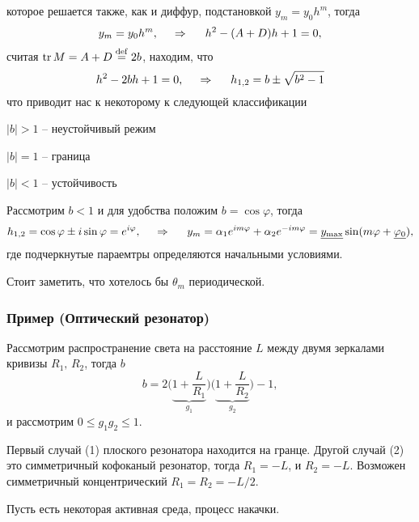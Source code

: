 которое решается также, как и диффур, подстановкой $y_m = y_0 h^m$, тогда
\begin{equation*}
    y_m = y_0 h^m, \hspace{0.5cm} \Rightarrow \hspace{0.5cm}
    h^2 - (A+D) h + 1 = 0,
\end{equation*}
считая $\mathop{\mathrm{tr}}\nolimits M = A+D \overset{\mathrm{def}}{=} 2 b$, находим, что
\begin{equation*}
    h^2 - 2 b h  +1 = 0, 
    \hspace{0.5cm} \Rightarrow \hspace{0.5cm}
    h_{1, 2} = b \pm \sqrt{b^2-1}
\end{equation*}
что приводит нас к некоторому к следующей классификации

$|b|>1$ -- неустойчивый режим

$|b|=1$ -- граница

$|b|<1$ -- устойчивость

\noindent
Рассмотрим $b < 1$ и для удобства положим $b = \cos \varphi$, тогда
\begin{equation*}
    h_{1, 2} = \cos \varphi \pm i \sin \varphi = e^{i\varphi},
    \hspace{0.5cm} \Rightarrow \hspace{0.5cm}
    y_m = \alpha_1 e^{im \varphi} + \alpha_2 e^{-im \varphi} = 
    \underline{y_{\textnormal{max}}} \sin (m \varphi + \underline{\varphi_0}),
\end{equation*}
где подчеркнутые параемтры определяются начальными условиями. 


Стоит заметить, что хотелось бы $\theta_m$ периодической. 




\subsubsection*{Пример (Оптический резонатор)}

Рассмотрим распространение света на расстояние $L$ между двумя зеркалами кривизы $R_1,\, R_2$, тогда $b$ 
\begin{equation*}
    b = 2 \bigg(\underbrace{1+\frac{L}{R_1}}_{g_1}\bigg)\bigg(\underbrace{1+\frac{L}{R_2}}_{g_2}\bigg) - 1,
\end{equation*}
и рассмотрим $0 \leq g_1 g_2 \leq 1$.


Первый случай (1) плоского резонатора находится на гранце. Другой случай (2) это симметричный кофоканый резонатор, тогда $R_1 = -L$, и $R_2 = - L$.  Возможен симметричный концентрический $R_1 = R_2 = -L/2$. 


Пусть есть некоторая активная среда, процесс накачки. 

